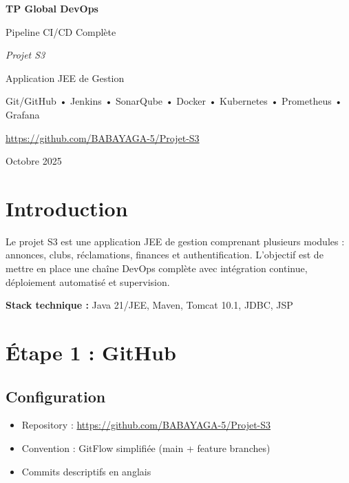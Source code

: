 \documentclass[11pt,a4paper]{article}
\begin{document}
\begin{titlepage}
    \centering
    \vspace*{2cm}
    
    {\Huge\bfseries TP Global DevOps\par}
    \vspace{1cm}
    {\Large Pipeline CI/CD Complète\par}
    \vspace{1.5cm}
    
    {\Large\itshape Projet S3\par}
    {\large Application JEE de Gestion\par}
    
    \vspace{2cm}
    
    \begin{tcolorbox}[colback=blue!5!white,colframe=blue!75!black,title=Technologies]
        Git/GitHub • Jenkins • SonarQube • Docker • Kubernetes • Prometheus • Grafana
    \end{tcolorbox}
    
    \vfill
    
    {\large \url{https://github.com/BABAYAGA-5/Projet-S3}\par}
    \vspace{0.5cm}
    {\large Octobre 2025\par}
\end{titlepage}

\tableofcontents
\newpage

\section{Introduction}

Le projet S3 est une application JEE de gestion comprenant plusieurs modules : annonces, clubs, réclamations, finances et authentification. L'objectif est de mettre en place une chaîne DevOps complète avec intégration continue, déploiement automatisé et supervision.

\textbf{Stack technique :} Java 21/JEE, Maven, Tomcat 10.1, JDBC, JSP

\newpage

\section{Étape 1 : GitHub}

\subsection{Configuration}
\begin{itemize}
    \item Repository : \url{https://github.com/BABAYAGA-5/Projet-S3}
    \item Convention : GitFlow simplifiée (main + feature branches)
    \item Commits descriptifs en anglais
\end{itemize}
\end{document}
